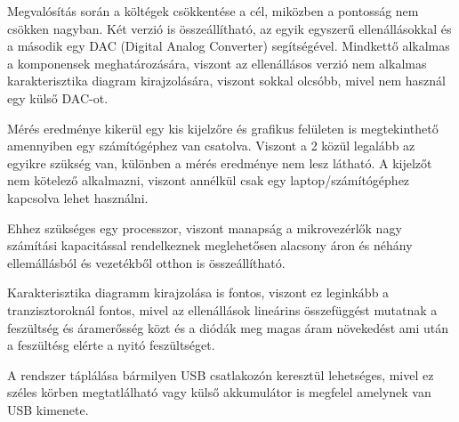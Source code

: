 Megvalósítás során a költégek csökkentése a cél, miközben a pontosság nem csökken nagyban. 
Két verzió is összeállítható, az egyik egyszerű ellenállásokkal és a második egy DAC (Digital 
Analog Converter) segítségével. Mindkettő alkalmas a komponensek meghatározására, viszont az 
ellenállásos verzió nem alkalmas karakterisztika diagram kirajzolására, viszont sokkal olcsóbb, 
mivel nem használ egy külső DAC-ot.

Mérés eredménye kikerül egy kis kijelzőre és grafikus felületen is megtekinthető amennyiben 
egy számítógéphez van csatolva. Viszont a 2 közül legalább az egyikre szükség van, különben a 
mérés eredménye nem lesz látható. A kijelzőt nem kötelező alkalmazni, viszont annélkül csak 
egy laptop/számítógéphez kapcsolva lehet használni.

Ehhez szükséges egy processzor, viszont manapság a mikrovezérlők nagy számítási kapacitással 
rendelkeznek meglehetősen alacsony áron és néhány ellemállásból és vezetékből otthon is 
összeállítható.

Karakterisztika diagramm kirajzolása is fontos, viszont ez leginkább a tranzisztoroknál 
fontos, mivel az ellenállások lineárins összefüggést mutatnak a feszültség és áramerősség közt 
és a diódák meg magas áram növekedést ami után a feszültésg elérte a nyitó feszültséget.

A rendszer táplálása bármilyen USB csatlakozón keresztül lehetséges, mivel ez széles körben 
megtatlálható vagy külső akkumulátor is megfelel amelynek van USB kimenete.
